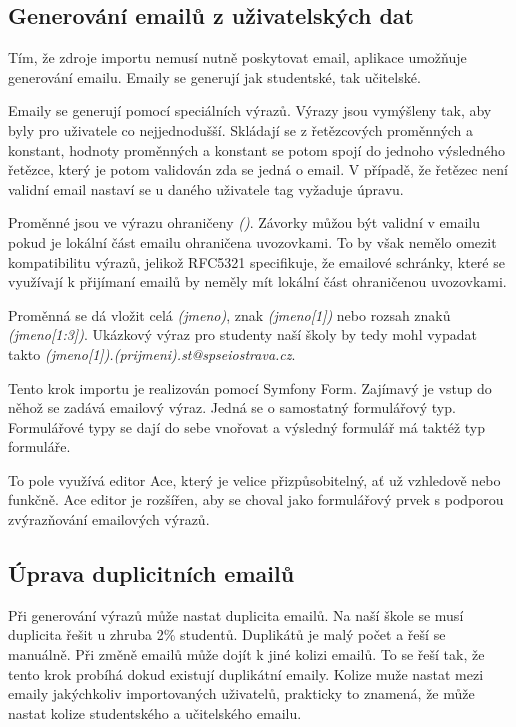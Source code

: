 \subsection{Generování emailů z uživatelských dat}

Tím, že zdroje importu nemusí nutně poskytovat email, aplikace umožňuje generování emailu.
Emaily se generují jak studentské, tak učitelské.

Emaily se generují pomocí speciálních výrazů.
Výrazy jsou vymýšleny tak, aby byly pro uživatele co nejjednodušší.
Skládají se z řetězcových proměnných a konstant, hodnoty proměnných a konstant se potom spojí do jednoho výsledného řetězce, který je potom validován zda se jedná o email.
V případě, že řetězec není validní email nastaví se u daného uživatele tag vyžaduje úpravu. 

Proměnné jsou ve výrazu ohraničeny \textit{()}.
Závorky můžou být validní v emailu pokud je lokální část emailu ohraničena uvozovkami\cite{wiki-email-address}.
To by však nemělo omezit kompatibilitu výrazů, jelikož RFC5321 specifikuje, že emailové schránky, které se využívají k přijímaní  emailů by neměly mít lokální část ohraničenou uvozovkami\cite{rfc5321}.

Proměnná se dá vložit celá \textit{(jmeno)}, znak \textit{(jmeno[1])} nebo rozsah znaků \textit{(jmeno[1:3])}.
Ukázkový výraz pro studenty naší školy by tedy mohl vypadat takto \textit{(jmeno[1]).(prijmeni).st@spseiostrava.cz}.

Tento krok importu je realizován pomocí Symfony Form.
Zajímavý je vstup do něhož se zadává emailový výraz.
Jedná se o samostatný formulářový typ. 
Formulářové typy se dají do sebe vnořovat a výsledný formulář má taktéž typ formuláře. 

To pole využívá editor Ace, který je velice přizpůsobitelný, ať už vzhledově nebo funkčně.
Ace editor je rozšířen, aby se choval jako formulářový prvek s podporou zvýrazňování emailových výrazů.

\subsection{Úprava duplicitních emailů}\label{postup:deduplikace-emailu}

Při generování výrazů může nastat duplicita emailů.
Na naší škole se musí duplicita řešit u zhruba 2\% studentů.
Duplikátů je malý počet a řeší se manuálně.
Při změně emailů může dojít k jiné kolizi emailů.
To se řeší tak, že tento krok probíhá dokud existují duplikátní emaily.
Kolize muže nastat mezi emaily jakýchkoliv importovaných uživatelů,
prakticky to znamená, že může nastat kolize studentského a učitelského emailu.

